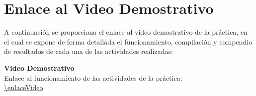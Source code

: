 
\section{Enlace al Video Demostrativo}

A continuación se proporciona el enlace al video demostrativo de la práctica, en el cual se expone de forma detallada el funcionamiento, compilación y compendio de resultados de cada una de las actividades realizadas:

\vspace{0.5cm}
\begin{center}
    \Large\textbf{Video Demostrativo} \\[0.5cm]
    \normalsize
    Enlace al funcionamiento de las actividades de la práctica: \\[0.3cm]
    \url{\enlaceVideo}
\end{center}

